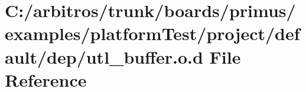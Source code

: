 \hypertarget{platform_test_2project_2default_2dep_2utl__buffer_8o_8d}{\section{C\-:/arbitros/trunk/boards/primus/examples/platform\-Test/project/default/dep/utl\-\_\-buffer.o.\-d File Reference}
\label{platform_test_2project_2default_2dep_2utl__buffer_8o_8d}
}
